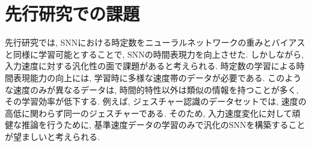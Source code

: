 \section{先行研究での課題}
先行研究では, SNNにおける時定数をニューラルネットワークの重みとバイアスと同様に学習可能とすることで, SNNの時間表現力を向上させた.
しかしながら, 入力速度に対する汎化性の面で課題があると考えられる.
時定数の学習による時間表現能力の向上には, 学習時に多様な速度帯のデータが必要である.
このような速度のみが異なるデータは, 時間的特性以外は類似の情報を持つことが多く, その学習効率が低下する.
例えば, ジェスチャー認識のデータセットでは, 速度の高低に関わらず同一のジェスチャーである.
そのため, 入力速度変化に対して頑健な推論を行うために, 基準速度データの学習のみで汎化のSNNを構築することが望ましいと考えられる.
